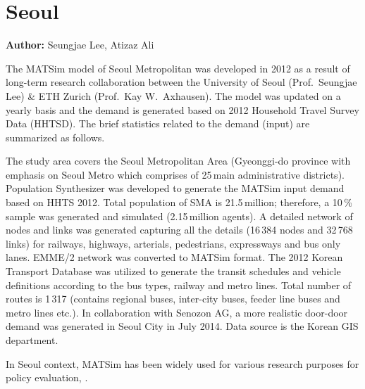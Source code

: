 \section{Seoul}
\label{sec:seoul}
\hfill \textbf{Author:} Seungjae Lee, Atizaz Ali

The MATSim model of Seoul Metropolitan was developed in 2012 as a result of long-term research collaboration between the University of Seoul (Prof.\ Seungjae Lee) \& ETH Zurich (Prof.\ Kay W.\ Axhausen). The model was updated on a yearly basis and the demand is generated based on 2012 Household Travel Survey Data (HHTSD). The brief statistics related to the demand (input) are summarized as follows. 

The study area covers the Seoul Metropolitan Area (Gyeonggi-do province with emphasis on Seoul Metro which comprises of 25\,main administrative districts). Population Synthesizer was developed to generate the MATSim input demand based on HHTS 2012. Total population of SMA is 21.5\,million; therefore, a 10\,\% sample was generated and simulated (2.15\,million agents). A detailed network of nodes and links was generated capturing all the details (16\,384 nodes and 32\,768 links) for railways, highways, arterials, pedestrians, expressways and bus only lanes. EMME/2 network was converted to MATSim format. The 2012 Korean Transport Database was utilized to generate the transit schedules and vehicle definitions according to the bus types, railway and metro lines. Total number of routes is 1\,317 (contains regional buses, inter-city buses, feeder line buses and metro lines etc.). In collaboration with Senozon AG, a more realistic door-door demand was generated in Seoul City in July 2014. Data source is the Korean GIS department.

In Seoul context, MATSim has been widely used for various research purposes for policy evaluation, \citet[see e.g.,][]{KimEtAl_IJHE_2012, LeeAli_unpub_IWUTSCD_2014}.

